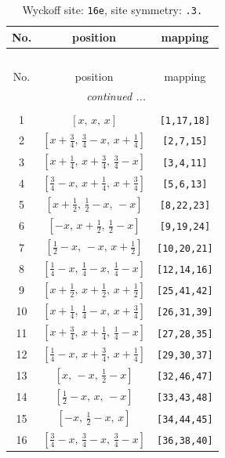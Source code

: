 \documentclass[fleqn,8pt]{jsarticle}
\begin{document}
\begin{longtable}{ccc}
\caption{Wyckoff site: {\tt 16e}, site symmetry: {\tt .3.}}
 \\
 \hline \hline
No. & position & mapping \\ \hline \endfirsthead

\multicolumn{2}{l}{\tablename\ \thetable{}} \\
 \hline \hline
No. & position & mapping \\ \hline \endhead

 \hline \hline
\multicolumn{2}{r}{\footnotesize\it continued ...} \\ \endfoot

 \hline \hline
\multicolumn{2}{r}{} \\ \endlastfoot

1 & $\left[ x,\, x,\, x \right]$ & {\tt [1,17,18]} \\ \hline
2 & $\left[ x + \frac{3}{4},\, \frac{3}{4} - x,\, x + \frac{1}{4} \right]$ & {\tt [2,7,15]} \\ \hline
3 & $\left[ x + \frac{1}{4},\, x + \frac{3}{4},\, \frac{3}{4} - x \right]$ & {\tt [3,4,11]} \\ \hline
4 & $\left[ \frac{3}{4} - x,\, x + \frac{1}{4},\, x + \frac{3}{4} \right]$ & {\tt [5,6,13]} \\ \hline
5 & $\left[ x + \frac{1}{2},\, \frac{1}{2} - x,\, - x \right]$ & {\tt [8,22,23]} \\ \hline
6 & $\left[ - x,\, x + \frac{1}{2},\, \frac{1}{2} - x \right]$ & {\tt [9,19,24]} \\ \hline
7 & $\left[ \frac{1}{2} - x,\, - x,\, x + \frac{1}{2} \right]$ & {\tt [10,20,21]} \\ \hline
8 & $\left[ \frac{1}{4} - x,\, \frac{1}{4} - x,\, \frac{1}{4} - x \right]$ & {\tt [12,14,16]} \\ \hline
9 & $\left[ x + \frac{1}{2},\, x + \frac{1}{2},\, x + \frac{1}{2} \right]$ & {\tt [25,41,42]} \\ \hline
10 & $\left[ x + \frac{1}{4},\, \frac{1}{4} - x,\, x + \frac{3}{4} \right]$ & {\tt [26,31,39]} \\ \hline
11 & $\left[ x + \frac{3}{4},\, x + \frac{1}{4},\, \frac{1}{4} - x \right]$ & {\tt [27,28,35]} \\ \hline
12 & $\left[ \frac{1}{4} - x,\, x + \frac{3}{4},\, x + \frac{1}{4} \right]$ & {\tt [29,30,37]} \\ \hline
13 & $\left[ x,\, - x,\, \frac{1}{2} - x \right]$ & {\tt [32,46,47]} \\ \hline
14 & $\left[ \frac{1}{2} - x,\, x,\, - x \right]$ & {\tt [33,43,48]} \\ \hline
15 & $\left[ - x,\, \frac{1}{2} - x,\, x \right]$ & {\tt [34,44,45]} \\ \hline
16 & $\left[ \frac{3}{4} - x,\, \frac{3}{4} - x,\, \frac{3}{4} - x \right]$ & {\tt [36,38,40]} \\
\end{longtable}
\end{document}

